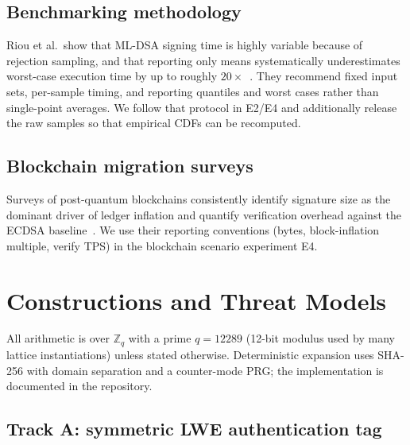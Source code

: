 \documentclass[11pt]{article}
\newcommand{\Zq}{\mathbb{Z}_q}
\begin{document}
\subsection{Benchmarking methodology}
Riou et al.\ show that ML-DSA signing time is highly variable because of
rejection sampling, and that reporting only means systematically underestimates
worst-case execution time by up to roughly $20\times$~\cite{mldsa-bench-2026}.
They recommend fixed input sets, per-sample timing, and reporting quantiles and
worst cases rather than single-point averages.  We follow that protocol in
E2/E4 and additionally release the raw samples so that empirical CDFs can be
recomputed.

\subsection{Blockchain migration surveys}
Surveys of post-quantum blockchains consistently identify signature size as the
dominant driver of ledger inflation and quantify verification overhead against
the ECDSA baseline~\cite{survey-pq-blockchain-2025,pq-transition-2026}.  We use
their reporting conventions (bytes, block-inflation multiple, verify TPS) in
the blockchain scenario experiment E4.

\section{Constructions and Threat Models}\label{sec:constr}

All arithmetic is over $\Zq$ with a prime $q=12289$ (12-bit modulus used by
many lattice instantiations) unless stated otherwise.  Deterministic expansion
uses SHA-256 with domain separation and a counter-mode PRG; the implementation
is documented in the repository.

\subsection{Track A: symmetric LWE authentication tag}\label{sec:tracka}
\end{document}
